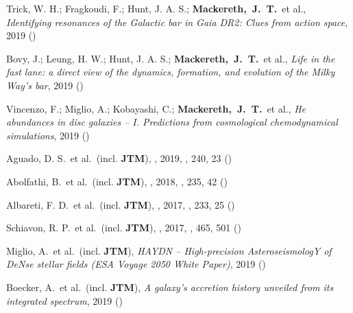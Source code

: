 \item[{\scriptsize9}]Trick, W. H.; Fragkoudi, F.; Hunt, J. A. S.; \textbf{Mackereth,~J.~T.}~et al., \textit{Identifying resonances of the Galactic bar in Gaia DR2: Clues from action space}, 2019 ()

\item[{\scriptsize8}]Bovy, J.; Leung, H. W.; Hunt, J. A. S.; \textbf{Mackereth,~J.~T.}~et al., \textit{Life in the fast lane: a direct view of the dynamics, formation, and evolution of the Milky Way's bar}, 2019 ()

\item[{\scriptsize7}]Vincenzo, F.; Miglio, A.; Kobayashi, C.; \textbf{Mackereth,~J.~T.}~et al., \textit{He abundances in disc galaxies -- I. Predictions from cosmological chemodynamical simulations}, 2019 ()

\item[{\scriptsize6}]Aguado, D. S.~et al.~(incl. \textbf{JTM}), , 2019, \apjs, {240}, 23 ()

\item[{\scriptsize5}]Abolfathi, B.~et al.~(incl. \textbf{JTM}), , 2018, \apjs, {235}, 42 ()

\item[{\scriptsize4}]Albareti, F. D.~et al.~(incl. \textbf{JTM}), , 2017, \apjs, {233}, 25 ()

\item[{\scriptsize3}]Schiavon, R. P.~et al.~(incl. \textbf{JTM}), , 2017, \mnras, {465}, 501 ()

\item[{\scriptsize2}]Miglio, A.~et al.~(incl. \textbf{JTM}), \textit{HAYDN -- High-precision AsteroseismologY of DeNse stellar fields (ESA Voyage 2050 White Paper)}, 2019 ()

\item[{\scriptsize1}]Boecker, A.~et al.~(incl. \textbf{JTM}), \textit{A galaxy's accretion history unveiled from its integrated spectrum}, 2019 ()